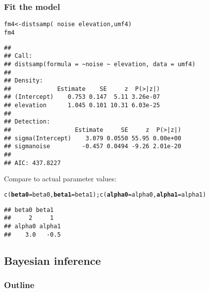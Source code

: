 \documentclass[color=usenames,dvipsnames]{beamer}\usepackage[]{graphicx}\usepackage[]{color}
\makeatletter
\newcommand{\hlopt}[1]{\textcolor[rgb]{0,0,0}{#1}}%
\newcommand{\hlstd}[1]{\textcolor[rgb]{0,0,0}{#1}}%
\newcommand{\hlkwb}[1]{\textcolor[rgb]{0,0.341,0.682}{#1}}%
\newcommand{\hlkwc}[1]{\textcolor[rgb]{0,0,0}{\textbf{#1}}}%
\newcommand{\hlkwd}[1]{\textcolor[rgb]{0.004,0.004,0.506}{#1}}%
\newenvironment{kframe}{%
 \def\at@end@of@kframe{}%
 \ifinner\ifhmode%
  \def\at@end@of@kframe{\end{minipage}}%
  \begin{minipage}{\columnwidth}%
 \fi\fi%
 \def\FrameCommand##1{\hskip\@totalleftmargin \hskip-\fboxsep
 \colorbox{shadecolor}{##1}\hskip-\fboxsep
     \hskip-\linewidth \hskip-\@totalleftmargin \hskip\columnwidth}%
 \MakeFramed {\advance\hsize-\width
   \@totalleftmargin\z@ \linewidth\hsize
   \@setminipage}}%
 {\par\unskip\endMakeFramed%
 \at@end@of@kframe}
\newenvironment{knitrout}{}{} %
\makeatother
\begin{document}
\begin{frame}[fragile]
  \frametitle{Fit the model}
  \footnotesize
\begin{knitrout}\tiny
{}\color{fgcolor}\begin{kframe}
\begin{alltt}
\hlstd{fm4} \hlkwb{<-} \hlkwd{distsamp}\hlstd{(}\hlopt{~}\hlstd{noise} \hlopt{~}\hlstd{elevation, umf4)}
\hlstd{fm4}
\end{alltt}
\begin{verbatim}
## 
## Call:
## distsamp(formula = ~noise ~ elevation, data = umf4)
## 
## Density:
##             Estimate    SE     z  P(>|z|)
## (Intercept)    0.753 0.147  5.11 3.26e-07
## elevation      1.045 0.101 10.31 6.03e-25
## 
## Detection:
##                  Estimate     SE     z  P(>|z|)
## sigma(Intercept)    3.079 0.0550 55.95 0.00e+00
## sigmanoise         -0.457 0.0494 -9.26 2.01e-20
## 
## AIC: 437.8227
\end{verbatim}
\end{kframe}
\end{knitrout}
\pause
\vfill
Compare to actual parameter values:
\vspace{-6pt}
\begin{knitrout}\tiny
{}\color{fgcolor}\begin{kframe}
\begin{alltt}
\hlkwd{c}\hlstd{(}\hlkwc{beta0}\hlstd{=beta0,} \hlkwc{beta1}\hlstd{=beta1);} \hlkwd{c}\hlstd{(}\hlkwc{alpha0}\hlstd{=alpha0,} \hlkwc{alpha1}\hlstd{=alpha1)}
\end{alltt}
\begin{verbatim}
## beta0 beta1 
##     2     1
## alpha0 alpha1 
##    3.0   -0.5
\end{verbatim}
\end{kframe}
\end{knitrout}
\end{frame}





\subsection{Bayesian inference}




\begin{frame}
  \frametitle{Outline}
  \Large
\end{frame}
\end{document}
